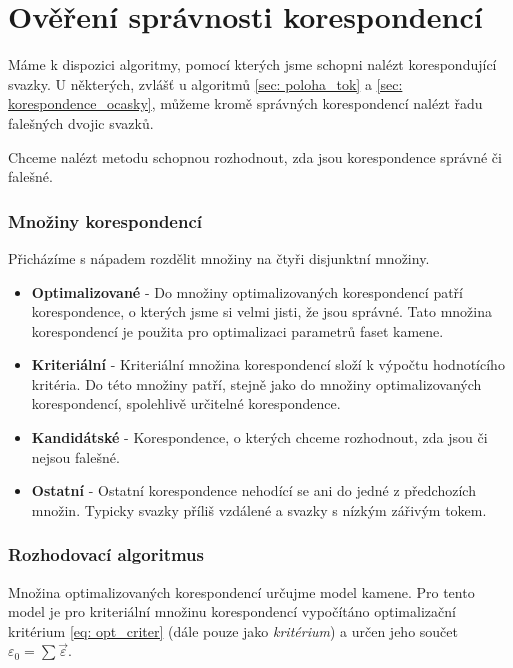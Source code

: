 \part{Ověření správnosti korespondencí}	
	
	Máme k dispozici algoritmy, pomocí kterých jsme schopni nalézt korespondující svazky. U některých, zvlášť u algoritmů \ref{sec: poloha_tok} a \ref{sec: korespondence_ocasky}, můžeme kromě správných korespondencí nalézt řadu falešných dvojic svazků.
	
	Chceme nalézt metodu schopnou rozhodnout, zda jsou korespondence správné či falešné. 
	
\section{Množiny korespondencí}
Přicházíme s nápadem rozdělit množiny na čtyři disjunktní množiny.

	\begin{itemize}
	\item \textbf{Optimalizované} -  Do množiny optimalizovaných korespondencí patří korespondence, o kterých jsme si velmi jisti, že jsou správné. Tato množina korespondencí je použita pro optimalizaci parametrů faset kamene. 
	
	\item \textbf{Kriteriální} - Kriteriální množina korespondencí složí k výpočtu hodnotícího kritéria. Do této množiny patří, stejně jako do množiny optimalizovaných korespondencí, spolehlivě určitelné korespondence.  
	
	\item \textbf{Kandidátské} - Korespondence, o kterých chceme rozhodnout, zda jsou či nejsou falešné.  
	
	\item \textbf{Ostatní} - Ostatní korespondence nehodící se ani do jedné z předchozích množin. Typicky svazky příliš vzdálené a svazky s nízkým zářivým tokem.  
\end{itemize}		
	
\section{Rozhodovací algoritmus}
	Množina optimalizovaných korespondencí určujme model kamene. Pro tento model je pro kriteriální množinu korespondencí vypočítáno optimalizační kritérium \ref{eq: opt_criter} (dále pouze jako \textit{kritérium}) a určen jeho součet $\varepsilon_0 = \sum\vec{\varepsilon}$.
	 
